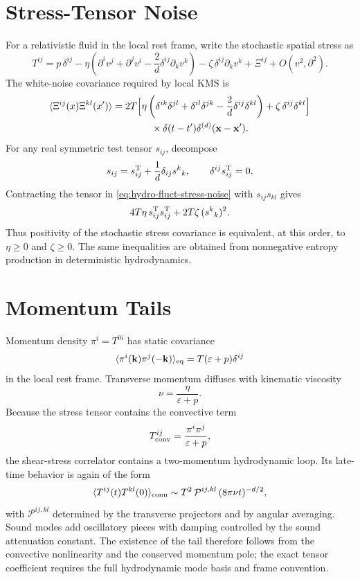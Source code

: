\section{Stress-Tensor Noise}

For a relativistic fluid in the local rest frame, write the stochastic
spatial stress as
\[
  T^{ij}
  =
  p\,\delta^{ij}
  -\eta
  \left(
    \partial^iv^j+\partial^jv^i
    -\frac{2}{d}\delta^{ij}\partial_kv^k
  \right)
  -\zeta\,\delta^{ij}\partial_kv^k
  +\Xi^{ij}
  +O(v^2,\partial^2).
\]
The white-noise covariance required by local KMS is
\begin{align}
  \langle\Xi^{ij}(x)\Xi^{kl}(x')\rangle
  &=
  2T\Bigl[
    \eta
    \left(
      \delta^{ik}\delta^{jl}
      +\delta^{il}\delta^{jk}
      -\frac{2}{d}\delta^{ij}\delta^{kl}
    \right)
    +\zeta\,\delta^{ij}\delta^{kl}
  \Bigr]
  \nonumber\\
  &\qquad\qquad\times
  \delta(t-t')\delta^{(d)}(\mathbf x-\mathbf x').
  \label{eq:hydro-fluct-stress-noise}
\end{align}
For any real symmetric test tensor \(s_{ij}\), decompose
\[
  s_{ij}=s^{\rm T}_{ij}+\frac{1}{d}\delta_{ij}s^k{}_k,
  \qquad
  \delta^{ij}s^{\rm T}_{ij}=0.
\]
Contracting the tensor in \eqref{eq:hydro-fluct-stress-noise} with
\(s_{ij}s_{kl}\) gives
\[
  4T\eta\,s^{\rm T}_{ij}s^{\rm T}_{ij}
  +
  2T\zeta\,(s^k{}_k)^2 .
\]
Thus positivity of the stochastic stress covariance is equivalent, at this
order, to \(\eta\ge0\) and \(\zeta\ge0\).  The same inequalities are obtained
from nonnegative entropy production in deterministic hydrodynamics.

\section{Momentum Tails}

Momentum density \(\pi^i=T^{0i}\) has static covariance
\[
  \langle\pi^i(\mathbf k)\pi^j(-\mathbf k)\rangle_{\rm eq}
  =
  T(\varepsilon+p)\delta^{ij}
\]
in the local rest frame.  Transverse momentum diffuses with kinematic
viscosity
\[
  \nu=\frac{\eta}{\varepsilon+p}.
\]
Because the stress tensor contains the convective term
\[
  T^{ij}_{\rm conv}
  =
  \frac{\pi^i\pi^j}{\varepsilon+p},
\]
the shear-stress correlator contains a two-momentum hydrodynamic loop.  Its
late-time behavior is again of the form
\[
  \langle T^{ij}(t)T^{kl}(0)\rangle_{\rm conn}
  \sim
  T^2\,\mathcal P^{ij,kl}\,
  (8\pi\nu t)^{-d/2},
\]
with \(\mathcal P^{ij,kl}\) determined by the transverse projectors and by
angular averaging.  Sound modes add oscillatory pieces with damping
controlled by the sound attenuation constant.  The existence of the tail
therefore follows from the convective nonlinearity and the conserved
momentum pole; the exact tensor coefficient requires the full hydrodynamic
mode basis and frame convention.

